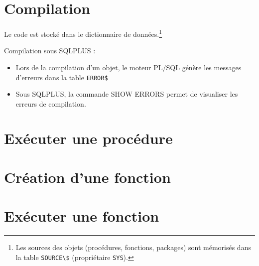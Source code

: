 \documentclass[10pt]{beamer}
\begin{document}
\section{Compilation}
\begin{frame}{\secname}
    
    Le code est stocké dans le dictionnaire de données.\footnote{Les sources des objets (procédures, fonctions, packages) sont mémorisés dans la table \lstinline[language=plsql]!SOURCE\$! (propriétaire \lstinline[language=plsql]!SYS!).}
\end{frame}

\begin{frame}{\secname}
    Compilation sous SQLPLUS :
    \begin{itemize}
        \item Lors de la compilation d'un objet, le moteur PL/SQL génère les messages d'erreurs dans la table \lstinline[language=plsql]!ERROR$!
        \item Sous SQLPLUS, la commande SHOW ERRORS permet de visualiser les erreurs de compilation.
    \end{itemize}
\end{frame}

\section{Exécuter une procédure}
\begin{frame}{\secname}
    
\end{frame}

\section{Création d’une fonction}
\begin{frame}{\secname}
    
\end{frame}

\begin{frame}[allowframebreaks]{\secname}
    
\end{frame}

\section{Exécuter une fonction}
\begin{frame}{\secname}
    
\end{frame}
\end{document}
